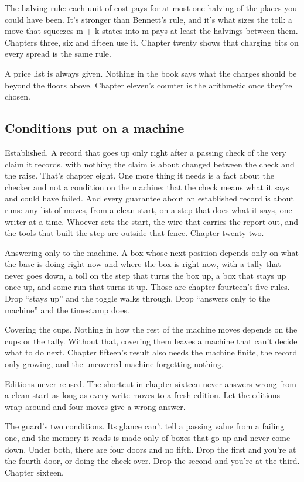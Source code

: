 \documentclass[11pt,twoside]{article}
\theoremstyle{thielethm}
\theoremstyle{thieledef}
\theoremstyle{thieledef}
\theoremstyle{thieledef}
\theoremstyle{thielethm}
\theoremstyle{thieleobs}
\theoremstyle{thielethm}
\begin{document}
The halving rule: each unit of cost pays for at most one halving of the places you could have been. It's stronger than Bennett's rule, and it's what sizes the toll: a move that squeezes m + k states into m pays at least the halvings between them. Chapters three, six and fifteen use it. Chapter twenty shows that charging bits on every spread is the same rule.

A price list is always given. Nothing in the book says what the charges should be beyond the floors above. Chapter eleven's counter is the arithmetic once they're chosen.

\subsection{Conditions put on a machine}

Established. A record that goes up only right after a passing check of the very claim it records, with nothing the claim is about changed between the check and the raise. That's chapter eight. One more thing it needs is a fact about the checker and not a condition on the machine: that the check means what it says and could have failed. And every guarantee about an established record is about runs: any list of moves, from a clean start, on a step that does what it says, one writer at a time. Whoever sets the start, the wire that carries the report out, and the tools that built the step are outside that fence. Chapter twenty-two.

Answering only to the machine. A box whose next position depends only on what the base is doing right now and where the box is right now, with a tally that never goes down, a toll on the step that turns the box up, a box that stays up once up, and some run that turns it up. Those are chapter fourteen's five rules. Drop ``stays up'' and the toggle walks through. Drop ``answers only to the machine'' and the timestamp does.

Covering the cups. Nothing in how the rest of the machine moves depends on the cups or the tally. Without that, covering them leaves a machine that can't decide what to do next. Chapter fifteen's result also needs the machine finite, the record only growing, and the uncovered machine forgetting nothing.

Editions never reused. The shortcut in chapter sixteen never answers wrong from a clean start as long as every write moves to a fresh edition. Let the editions wrap around and four moves give a wrong answer.

The guard's two conditions. Its glance can't tell a passing value from a failing one, and the memory it reads is made only of boxes that go up and never come down. Under both, there are four doors and no fifth. Drop the first and you're at the fourth door, or doing the check over. Drop the second and you're at the third. Chapter sixteen.
\end{document}
